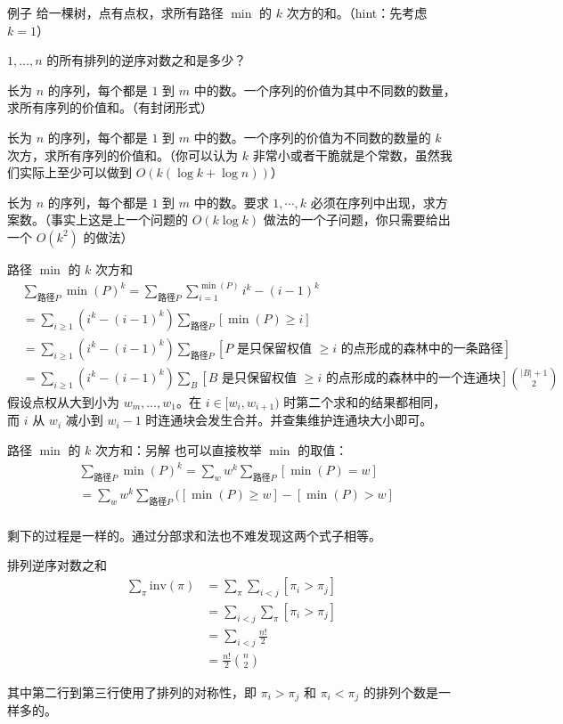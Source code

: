 \begin{frame}{例子}
    给一棵树，点有点权，求所有路径 $\min$ 的 $k$ 次方的和。（hint：先考虑 $k=1$）

    $1,\ldots,n$ 的所有排列的逆序对数之和是多少？

    长为 $n$ 的序列，每个都是 $1$ 到 $m$ 中的数。一个序列的价值为其中不同数的数量，求所有序列的价值和。（有封闭形式）

    长为 $n$ 的序列，每个都是 $1$ 到 $m$ 中的数。一个序列的价值为不同数的数量的 $k$ 次方，求所有序列的价值和。（你可以认为 $k$ 非常小或者干脆就是个常数，虽然我们实际上至少可以做到 $O(k(\log k+\log n))$） 

    长为 $n$ 的序列，每个都是 $1$ 到 $m$ 中的数。要求 $1,\cdots,k$ 必须在序列中出现，求方案数。（事实上这是上一个问题的 $O(k\log k)$ 做法的一个子问题，你只需要给出一个 $O(k^2)$ 的做法）
\end{frame}
\begin{frame}{路径 $\min$ 的 $k$ 次方和}
    $$
    \begin{aligned}
        &\sum_{\text{路径}P}\min(P)^k=\sum_{\text{路径}P}\sum_{i=1}^{\min(P)}i^k-(i-1)^k\\
        &=\sum_{i\ge 1}(i^k-(i-1)^k)\sum_{\text{路径}P}[\min(P)\ge i]\\
        &=\sum_{i\ge 1}(i^k-(i-1)^k)\sum_{\text{路径}P}[P\text{ 是只保留权值 }\ge i \text{ 的点形成的森林中的一条路径}]\\
        &=\sum_{i\ge 1}(i^k-(i-1)^k)\sum_{B}[B\text{ 是只保留权值 }\ge i\text{ 的点形成的森林中的一个连通块}]\binom{|B|+1}{2}
    \end{aligned}
    $$
    假设点权从大到小为 $w_m,\ldots,w_1$。在 $i\in [w_i,w_{i+1})$ 时第二个求和的结果都相同，而 $i$ 从 $w_i$ 减小到 $w_i-1$ 时连通块会发生合并。并查集维护连通块大小即可。
\end{frame}
\begin{frame}{路径 $\min$ 的 $k$ 次方和：另解}
    也可以直接枚举 $\min$ 的取值：
    $$
    \begin{aligned}
        &\sum_{\text{路径}P}\min(P)^k=\sum_w w^k\sum_{\text{路径}P}[\min(P)=w]\\
        &=\sum_{w}w^k\sum_{\text{路径}P}([\min(P)\ge w]-[\min(P)>w]\\
    \end{aligned}
    $$

    剩下的过程是一样的。通过分部求和法也不难发现这两个式子相等。
\end{frame}
\begin{frame}{排列逆序对数之和}
    $$
    \begin{aligned}
    \sum_{\pi}\mathrm{inv}(\pi)&=\sum_{\pi}\sum_{i<j}[\pi_i>\pi_j]\\
    &=\sum_{i<j}\sum_{\pi}[\pi_i>\pi_j]\\
    &=\sum_{i<j}\frac{n!}{2}\\
    &=\frac{n!}{2}\binom{n}{2}
    \end{aligned}
    $$

    其中第二行到第三行使用了排列的对称性，即 $\pi_i>\pi_j$ 和 $\pi_i<\pi_j$ 的排列个数是一样多的。
\end{frame}
